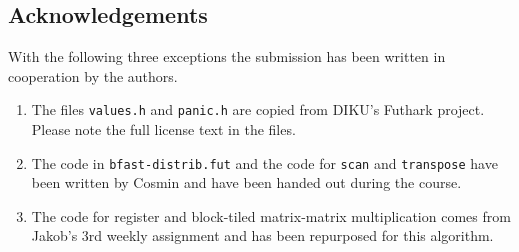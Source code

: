 \subsection*{Acknowledgements}
With the following three exceptions the submission has been written in
cooperation by the authors.

\begin{enumerate}
\item The files \texttt{values.h} and \texttt{panic.h} are copied from DIKU's Futhark
project. Please note the full license text in the files.

\item The code in  \texttt{bfast-distrib.fut} and the code for \texttt{scan} and
\texttt{transpose} have been written by Cosmin and have been handed out during
the course.

\item The code for register and block-tiled matrix-matrix multiplication comes
    from Jakob's 3rd weekly assignment and has been repurposed for this
    algorithm.
\end{enumerate}


